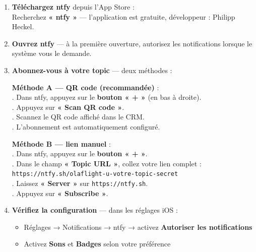 \documentclass[a4paper, 11pt]{article}
\begin{document}
\begin{enumerate}[leftmargin=*, label=\textbf{\arabic*.}]

  \item \textbf{Téléchargez ntfy} depuis l'App Store :\\
  Recherchez \textbf{« ntfy »} — l'application est gratuite, développeur : Philipp Heckel.

  \item \textbf{Ouvrez ntfy} — à la première ouverture, autorisez les notifications
  lorsque le système vous le demande.

  \item \textbf{Abonnez-vous à votre topic} — deux méthodes :

  \begin{stepbox}
  \textbf{Méthode A — QR code (recommandée)} :\\[0.5em]
  . Dans ntfy, appuyez sur le \textbf{bouton « + »} (en bas à droite).\\
  . Appuyez sur \textbf{« Scan QR code »}.\\
  . Scannez le QR code affiché dans le CRM.\\
  . L'abonnement est automatiquement configuré.
  \end{stepbox}

  \begin{stepbox}
  \textbf{Méthode B — lien manuel} :\\[0.5em]
  . Dans ntfy, appuyez sur le \textbf{bouton « + »}.\\
  . Dans le champ \textbf{« Topic URL »}, collez votre lien complet :\\
  \quad\quad \texttt{https://ntfy.sh/olaflight-u-votre-topic-secret}\\
  . Laissez \textbf{« Server »} sur \texttt{https://ntfy.sh}.\\
  . Appuyez sur \textbf{« Subscribe »}.
  \end{stepbox}

  \item \textbf{Vérifiez la configuration} — dans les réglages iOS :
  \begin{itemize}[leftmargin=2em]
    \item Réglages → Notifications → ntfy → activez \textbf{Autoriser les notifications}
    \item Activez \textbf{Sons} et \textbf{Badges} selon votre préférence
  \end{itemize}

\end{enumerate}
\end{document}

